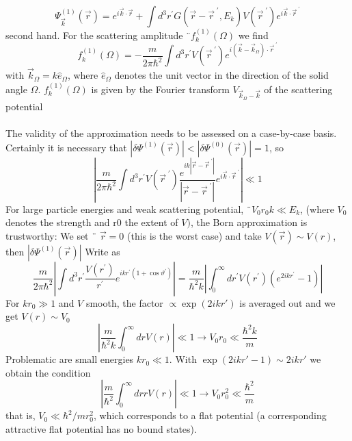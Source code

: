 \begin{equation}
    \Psi_{\vec{k}}^{(1)}(\vec{r})=e^{i \vec{k} \cdot \vec{r}}+\int d^{3} r^{\prime} G\left(\vec{r}-\vec{r}^{\;\prime}, E_{k}\right) V\left(\vec{r}^{\;\prime}\right) e^{i \vec{k} \cdot \vec{r}^{\;\prime}}
    \end{equation}
second hand. For the scattering amplitude ¨$f_k^{(1)}(\Omega)$ we find
\begin{equation}
    f_{k}^{(1)}(\Omega)=-\frac{m}{2 \pi \hbar^{2}} \int d^{3} r^{\prime} V\left(\vec{r}^{\;\prime}\right) e^{i\left(\vec{k}-\vec{k}_{\Omega}\right) \cdot \vec{r}^{\;\prime}}
    \end{equation}
with $\vec{k}_{\Omega}=k\hat{e}_{\Omega}$, where $\hat{e}_\Omega$ denotes the unit vector in the direction of the solid angle $\Omega$. $f^{(1)}_k (\Omega)$ is given by the Fourier transform $V_{\vec{k}_{\Omega}-\vec{k}}$ of the scattering potential
\\\\
The validity of the approximation needs to be assessed on a case-by-case basis. Certainly it is necessary that $| \delta\Psi^{(1)} (\vec{r}) | <| \delta\Psi^{(0)} (\vec{r}) | = 1$, so
%
\begin{equation}
    \left|\frac{m}{2 \pi \hbar^{2}} \int d^{3} r^{\prime} V\left(\vec{r}^{\;\prime}\right) \frac{e^{i k\left|\vec{r}-\vec{r}^{\;\prime}\right|}}{\left|\vec{r}-\vec{r}^{\;\prime}\right|} e^{i \vec{k} \cdot \vec{r}^{\;\prime}}\right| \ll 1
    \end{equation}
For large particle energies and weak scattering potential, ¨$V_0 r_0k \ll E_k$, (where $V_0$ denotes the strength and r0 the extent of $V)$, the Born approximation is trustworthy: We set ¨ $\vec{r} = 0$ (this is the worst case) and take $V (\vec{r}) \sim V (r)$, then $| \delta\Psi^{(1)} (\vec{r}) |$ Write as
$$
    \frac{m}{2 \pi \hbar^{2}}\left|\int d^{3} r^{\prime} \frac{V\left(r^{\prime}\right)}{r^{\prime}} e^{i k r^{\prime}\left(1+\cos \vartheta^{\prime}\right)}\right|=\frac{m}{\hbar^{2} k}\left|\int_{0}^{\infty} d r^{\prime} V\left(r^{\prime}\right)\left(e^{2 i k r^{\prime}}-1\right)\right|
$$
For $kr_0\gg 1$ and $V$ smooth, the factor $\propto\operatorname{exp} (2ikr')$ is averaged out and we get $V (r) \sim V_0$
\begin{equation}
    \left|\frac{m}{\hbar^{2} k} \int_{0}^{\infty} d r V(r)\right| \ll 1 \rightarrow V_{0} r_{0} \ll \frac{\hbar^{2} k}{m}
    \end{equation}
Problematic are small energies $kr_0\ll 1$. With $\operatorname{exp} (2ikr' - 1) \sim 2ikr'$ we obtain the condition
\begin{equation}
    \left|\frac{m}{\hbar^{2}} \int_{0}^{\infty} d r r V(r)\right| \ll 1 \rightarrow V_{0} r_{0}^{2} \ll \frac{\hbar^{2}}{m}
    \end{equation}
that is, $V_0 \ll \hbar^2 / mr^2_0$, which corresponds to a flat potential (a corresponding attractive flat potential has no bound states).

